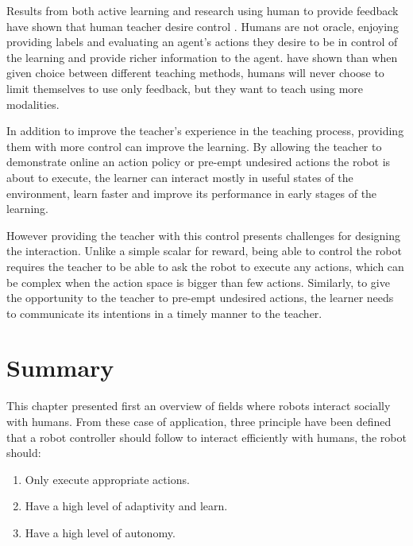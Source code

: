 Results from both active learning and research using human to provide feedback have shown that human teacher desire control \citep{amershi2014power}. Humans are not oracle, enjoying providing labels and evaluating an agent's actions they desire to be in control of the learning and provide richer information to the agent. \cite{kaochar2011towards} have shown than when given choice between different teaching methods, humans will never choose to limit themselves to use only feedback, but they want to teach using more modalities.

In addition to improve the teacher's experience in the teaching process, providing them with more control can improve the learning. By allowing the teacher to demonstrate online an action policy or pre-empt undesired actions the robot is about to execute, the learner can interact mostly in useful states of the environment, learn faster and improve its performance in early stages of the learning.

However providing the teacher with this control presents challenges for designing the interaction. Unlike a simple scalar for reward, being able to control the robot requires the teacher to be able to ask the robot to execute any actions,  which can be complex when the action space is bigger than few actions. Similarly, to give the opportunity to the teacher to pre-empt undesired actions, the learner needs to communicate its intentions in a timely manner to the teacher. %




\section{Summary}

This chapter presented first an overview of fields where robots interact socially with humans. From these case of application, three principle have been defined that a robot controller should follow to interact efficiently with humans, the robot should:
\begin{enumerate}
   	\item Only execute appropriate actions.
   	\item Have a high level of adaptivity and learn.
   	\item Have a high level of autonomy.
\end{enumerate}

